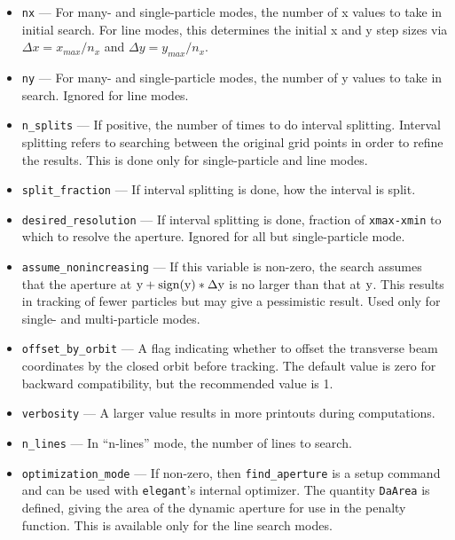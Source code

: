 \documentclass[11pt]{article}
\begin{document}
\begin{itemize}
\item \verb|nx| --- For many- and single-particle modes, the number of x values to take in initial search.
  For line modes, this determines the initial x and y step sizes via $\Delta x = x_{max}/n_x$ and
  $\Delta y = y_{max}/n_x$.
\item \verb|ny| --- For many- and single-particle modes, the number of y values to take in search.
  Ignored for line modes.

\item \verb|n_splits| --- If positive, the number of times to do
interval splitting.  Interval splitting refers to searching between
the original grid points in order to refine the results.  This is done
only for single-particle and line modes.

\item \verb|split_fraction| --- If interval splitting is done, how the interval is split.

\item \verb|desired_resolution| --- If interval splitting is done,
fraction of \verb|xmax-xmin| to which to resolve the aperture.  Ignored for all but single-particle
mode.

\item \verb|assume_nonincreasing| --- If this variable is non-zero, the search assumes that the aperture
at ${\rm y+sign(y)*\Delta y}$ is no larger than that at ${\rm y}$.  This results in tracking of
fewer particles but may give a pessimistic result.    Used only for single- and multi-particle
modes.

\item \verb|offset_by_orbit| --- A flag indicating whether to offset
the transverse beam coordinates by the closed orbit before tracking.  The default value is
zero for backward compatibility, but the recommended value is 1.

\item \verb|verbosity| --- A larger value results in more printouts during computations.

\item \verb|n_lines| --- In ``n-lines'' mode, the number of lines to search.

\item \verb|optimization_mode| --- If non-zero, then \verb|find_aperture| is a setup command and can be used
with {\tt elegant}'s internal optimizer.  The quantity \verb|DaArea| is defined, giving the area of the dynamic
aperture for use in the penalty function.  This is available only for the line search modes.

\end{itemize}
\end{document}

